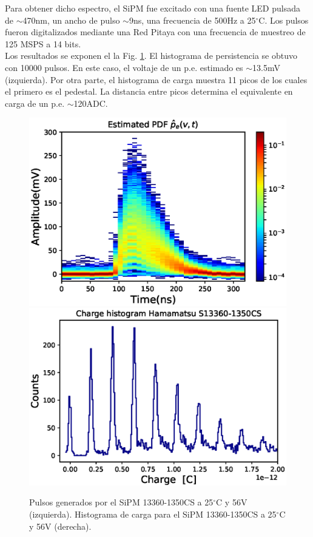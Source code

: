 Para obtener dicho espectro, el SiPM fue excitado con una fuente LED pulsada de $\sim$470nm, un ancho de pulso $\sim$9ns, una frecuencia de 500Hz a 25$^{\circ}$C. Los pulsos fueron digitalizados mediante una Red Pitaya con una frecuencia de muestreo de 125 MSPS a 14 bits.\\

Los resultados se exponen el la Fig. \ref{Charge}. El histograma de persistencia se obtuvo con 10000 pulsos. En este caso,  el voltaje de un p.e. estimado es $\sim$13.5mV (izquierda). Por otra parte, el histograma de carga muestra 11 picos de los cuales el primero es el pedestal. La distancia entre picos determina el equivalente en carga de un p.e. $\sim$120ADC.

\begin{figure}[h!]
\centering
\includegraphics[scale=0.55]{Figures/Pulses} 
\includegraphics[scale=0.55]{Figures/Charge}
\caption{Pulsos generados por el SiPM 13360-1350CS a 25$^{\circ}$C y 56V (izquierda). Histograma de carga para el SiPM 13360-1350CS a 25$^{\circ}$C y 56V (derecha).}
\label{Charge}
\end{figure}


